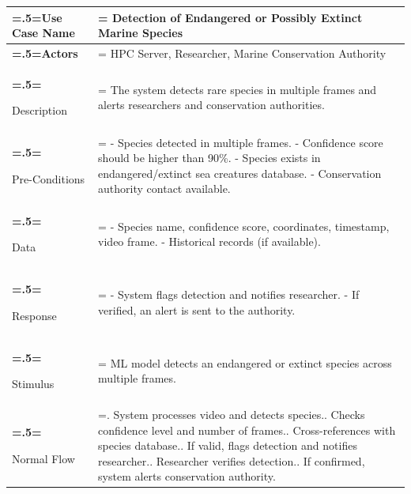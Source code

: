 \begin{table}[H] 
  \centering
  \footnotesize
  \begin{tabularx}{\textwidth}{|>{\bfseries\hsize=.5\hsize\linewidth=\hsize}X|
  >{\hsize=1.5\hsize\linewidth=\hsize}X|}
  \hline
  Use Case Name       & Detection of Endangered or Possibly Extinct Marine Species \\ \hline
  
  Actors              & HPC Server, Researcher, Marine Conservation Authority \\ \hline
  
  Description         & The system detects rare species in multiple frames and alerts researchers and conservation authorities. \\ \hline
  
  Pre-Conditions      & 
  - Species detected in multiple frames.\newline
  - Confidence score should be higher than 90\%.\newline
  - Species exists in endangered/extinct sea creatures database.\newline
  - Conservation authority contact available. \\ \hline
  
  Data                & 
  - Species name, confidence score, coordinates, timestamp, video frame.\newline
  - Historical records (if available). \\ \hline
  
  Response            & 
  - System flags detection and notifies researcher.\newline
  - If verified, an alert is sent to the authority. \\ \hline
  
  Stimulus            & ML model detects an endangered or extinct species across multiple frames. \\ \hline
  
  Normal Flow         & 
  1. System processes video and detects species.\newline
  2. Checks confidence level and number of frames.\newline
  3. Cross-references with species database.\newline
  4. If valid, flags detection and notifies researcher.\newline
  5. Researcher verifies detection.\newline
  6. If confirmed, system alerts conservation authority. \\ \hline
  

\end{tabularx}
\end{table}

